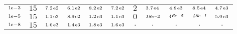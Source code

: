 \begin{tiny}
\begin{tabular}{@{$\;$}c@{$\;$}|@{$\;$}c@{$\;$}@{$\;$}c@{$\;$}@{$\;$}c@{$\;$}@{$\;$}c@{$\;$}@{$\;$}c@{$\;$}|@{$\;$}c@{$\;$}@{$\;$}c@{$\;$}@{$\;$}c@{$\;$}@{$\;$}c@{$\;$}@{$\;$}c@{$\;$}}
$\scriptstyle1\!\mathrm{\hspace{0.10em}e}-3$ & $\scriptstyle15$ & $\scriptstyle7.2\mathrm{\hspace{0.10em}e}2$ & $\scriptstyle6.1\mathrm{\hspace{0.10em}e}2$ & $\scriptstyle8.2\mathrm{\hspace{0.10em}e}2$ & $\scriptstyle7.2\mathrm{\hspace{0.10em}e}2$ & $\scriptstyle2$ & $\scriptstyle3.7\mathrm{\hspace{0.10em}e}4$ & $\scriptstyle4.8\mathrm{\hspace{0.10em}e}3$ & $\scriptstyle8.5\mathrm{\hspace{0.10em}e}4$ & $\scriptstyle4.7\mathrm{\hspace{0.10em}e}3$\\ 
$\scriptstyle1\!\mathrm{\hspace{0.10em}e}-5$ & $\scriptstyle15$ & $\scriptstyle1.1\mathrm{\hspace{0.10em}e}3$ & $\scriptstyle8.9\mathrm{\hspace{0.10em}e}2$ & $\scriptstyle1.2\mathrm{\hspace{0.10em}e}3$ & $\scriptstyle1.1\mathrm{\hspace{0.10em}e}3$ & $\scriptstyle0$ & $\scriptstyle\textit{18}\hspace{0.00em}e\textit{--2}$ & $\scriptstyle\textit{46}\hspace{0.00em}e\textit{--5}$ & $\scriptstyle\textit{46}\hspace{0.00em}e\textit{--1}$ & $\scriptstyle5.0\mathrm{\hspace{0.10em}e}3$\\ 
$\scriptstyle1\!\mathrm{\hspace{0.10em}e}-8$ & $\scriptstyle15$ & $\scriptstyle1.6\mathrm{\hspace{0.10em}e}3$ & $\scriptstyle1.4\mathrm{\hspace{0.10em}e}3$ & $\scriptstyle1.8\mathrm{\hspace{0.10em}e}3$ & $\scriptstyle1.6\mathrm{\hspace{0.10em}e}3$ & $\scriptstyle.$ & $\scriptstyle.$ & $\scriptstyle.$ & $\scriptstyle.$ & $\scriptstyle.$\\ 
\end{tabular} 
\end{tiny} 
